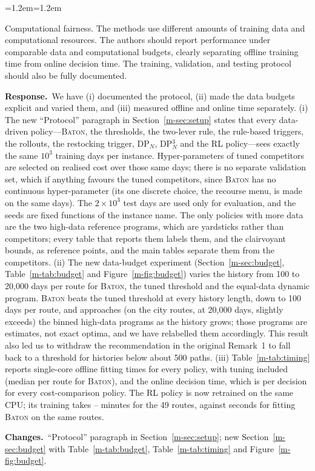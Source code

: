 \documentclass[11pt]{article}
\newenvironment{comment}{\par\medskip\noindent\color{rev}\itshape
  \begin{list}{}{\leftmargin=1.2em\rightmargin=1.2em}\item[]}%
  {\end{list}\par}
\newcommand{\resp}{\par\noindent\textbf{Response.}\ }
\newcommand{\chg}{\par\noindent\textbf{Changes.}\ }
\newcommand{\sref}[1]{Section~\ref{m-#1}}
\newcommand{\tref}[1]{Table~\ref{m-#1}}
\newcommand{\fref}[1]{Figure~\ref{m-#1}}
\newcommand{\BATON}{\textsc{Baton}}
\begin{document}
\begin{comment}
Computational fairness. The methods use different amounts of training
data and computational resources. The authors should report performance
under comparable data and computational budgets, clearly separating
offline training time from online decision time. The training,
validation, and testing protocol should also be fully documented.
\end{comment}
\resp We have (i) documented the protocol, (ii) made the data budgets
explicit and varied them, and (iii) measured offline and online time
separately. (i) The new ``Protocol'' paragraph in \sref{sec:setup}
states that every data-driven policy---\BATON, the thresholds, the
two-lever rule, the rule-based triggers, the rollouts, the restocking
trigger, DP$_N$, DP$^3_N$ and the RL policy---sees exactly the same
$10^3$ training days per instance.
Hyper-parameters of tuned competitors are selected on realised cost
over those same days; there is no separate validation set, which if
anything favours the tuned competitors, since \BATON{} has no
continuous hyper-parameter (its one discrete choice, the recourse menu,
is made on the same days). The $2\times10^3$ test days are used only for evaluation, and the
seeds are fixed functions of the instance name. The only policies with
more data are the two high-data reference programs, which are
yardsticks rather than competitors; every table that reports them labels
them, and the clairvoyant bounds, as reference points, and the main
tables separate them from the competitors. (ii) The new data-budget experiment (\sref{sec:budget},
\tref{tab:budget} and \fref{fig:budget}) varies the history from 100 to
20{,}000 days per route for \BATON, the tuned threshold and the
equal-data dynamic program. \BATON{} beats the tuned threshold at every
history length, down to 100 days per route, and approaches (on the city
routes, at 20{,}000 days, slightly exceeds) the binned high-data
programs as the history grows; those programs are estimates, not exact
optima, and we have relabelled them accordingly. This result also led us to withdraw the
recommendation in the original Remark~1 to fall back to a threshold for
histories below about 500 paths. (iii) \tref{tab:timing} reports
single-core offline fitting times for every policy, with tuning
included (median \timeBatonMs{} per route for \BATON), and the online
decision time, which is \timeOnlineUs{} per decision for every
cost-comparison policy. The RL policy is now retrained on the same CPU;
its training takes \rlTrainMin--\rlTrainMax{} minutes for the 49 routes,
against \rlBatonFitS{} seconds for fitting \BATON{} on the same routes.
\chg ``Protocol'' paragraph in \sref{sec:setup}; new
\sref{sec:budget} with \tref{tab:budget}, \tref{tab:timing} and
\fref{fig:budget}.
\end{document}
